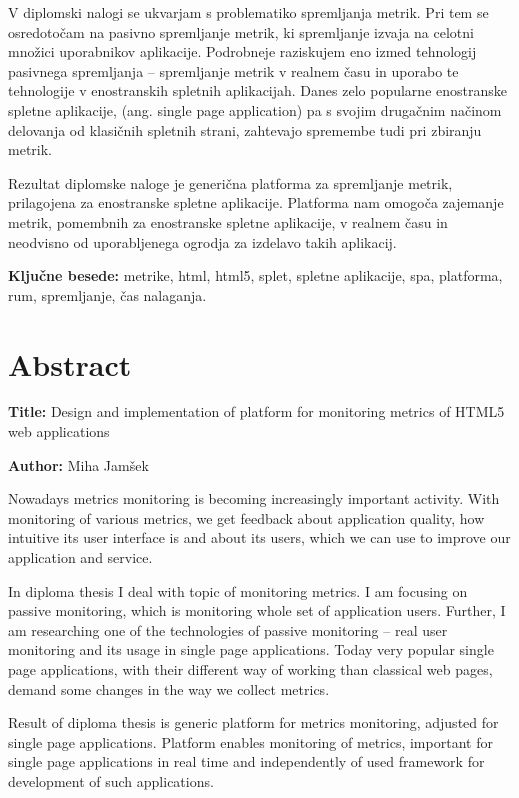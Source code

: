 \documentclass[a4paper, 12pt]{book}
\newcommand{\ttitleEn}{Design and implementation of platform for monitoring metrics of HTML5 web applications}
\newcommand{\tauthor}{Miha Jamšek}
\newcommand{\tkeywords}{metrike, html, html5, splet, spletne aplikacije, spa, platforma, rum, spremljanje, čas nalaganja}
\newcommand{\clearemptydoublepage}{\newpage{\pagestyle{empty}\cleardoublepage}}
\begin{document}
V diplomski nalogi se ukvarjam s problematiko spremljanja metrik. Pri tem se osredotočam na pasivno spremljanje metrik, ki spremljanje izvaja na celotni množici uporabnikov aplikacije. Podrobneje raziskujem eno izmed tehnologij pasivnega spremljanja – spremljanje metrik v realnem času in uporabo te tehnologije v enostranskih spletnih aplikacijah. Danes zelo popularne enostranske spletne aplikacije, (ang. single page application) pa s svojim drugačnim načinom delovanja od klasičnih spletnih strani, zahtevajo spremembe tudi pri zbiranju metrik.

Rezultat diplomske naloge je generična platforma za spremljanje metrik, prilagojena za enostranske spletne aplikacije. Platforma nam omogoča zajemanje metrik, pomembnih za enostranske spletne aplikacije, v realnem času in neodvisno od uporabljenega ogrodja za izdelavo takih aplikacij.

\bigskip

\noindent\textbf{Ključne besede:} \tkeywords.
\clearemptydoublepage

\chapter*{Abstract}

\noindent\textbf{Title:} \ttitleEn
\bigskip

\noindent\textbf{Author:} \tauthor
\bigskip

\noindent
Nowadays metrics monitoring is becoming increasingly important activity. With monitoring of various metrics, we get feedback about application quality, how intuitive its user interface is and about its users, which we can use to improve our application and service.

In diploma thesis I deal with topic of monitoring metrics. I am focusing on passive monitoring, which is monitoring whole set of application users. Further, I am researching one of the technologies of passive monitoring – real user monitoring and its usage in single page applications. Today very popular single page applications, with their different way of working than classical web pages, demand some changes in the way we collect metrics.

Result of diploma thesis is generic platform for metrics monitoring, adjusted for single page applications. Platform enables monitoring of metrics, important for single page applications in real time and independently of used framework for development of such applications.
\end{document}
